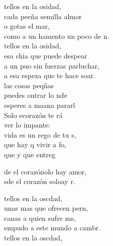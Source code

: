 \begin{cancion}%
	tellos en la osidad,\\
	cada peeña semilla almor\\
	o gotas  el mar,\\
	como a un hamento un poco de n.\\
	tellos en la osidad,\\
	esa chia que puede despear\\
	a un puo sin fuerzas parluchar,\\
	a esa espeza que te hace soar.\\
	 las cosas peqñas \\
	puedes ontrar lo nde\\
	esperes a maana pararl\\
	Solo ecorazón te rá \\
	ver lo impante: \\
	 vida es un rego de tu s,\\
	que hay q vivir a fo, \\
	que y que entreg   \\
	\begin{chorus}%
	de el corazónolo hay amor,\\
	sde el corazón soloay r.\\
	\end{chorus}%
	tellos en la oscdad,\\
	unas mas que ofrecen pern, \\
	canas a quien sufre ms,\\
	empudo a este mundo a cambr.\\
	tellos en la oscdad,\\

\end{cancion}
